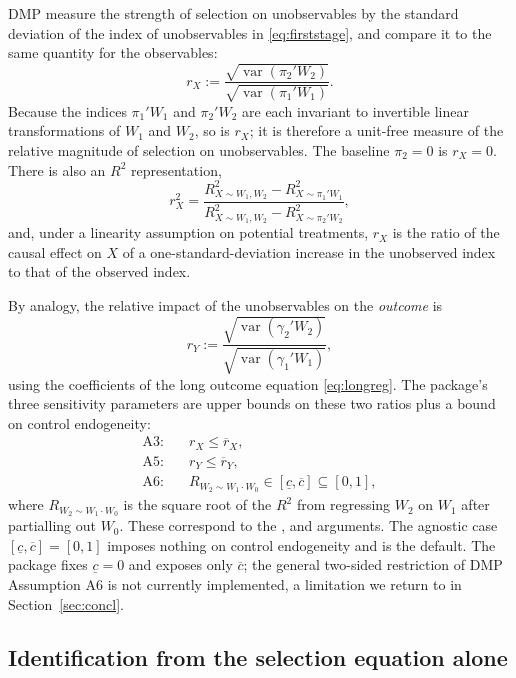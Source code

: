 \documentclass[article]{jss}\usepackage[]{graphicx}\usepackage[]{xcolor}
\newcommand{\rxbar}{\ensuremath{\overline{r}_X}}
\newcommand{\rybar}{\ensuremath{\overline{r}_Y}}
\newcommand{\cbar}{\ensuremath{\overline{c}}}
\newcommand{\clow}{\ensuremath{\underline{c}}}
\newcommand{\Rsq}[1]{\ensuremath{R^2_{#1}}}
\newcommand{\Var}{\operatorname{var}}
\begin{document}
DMP measure the strength of selection on unobservables by the standard
deviation of the index of unobservables in \eqref{eq:firststage}, and
compare it to the same quantity for the observables:
\begin{equation}
r_X := \frac{\sqrt{\Var(\pi_2' W_2)}}{\sqrt{\Var(\pi_1' W_1)}}.
\label{eq:rx}
\end{equation}
Because the indices $\pi_1' W_1$ and $\pi_2' W_2$ are each invariant to
invertible linear transformations of $W_1$ and $W_2$, so is $r_X$; it is
therefore a unit-free measure of the relative magnitude of selection on
unobservables. The baseline $\pi_2 = 0$ is $r_X = 0$. There is also an
$R^2$ representation,
\begin{equation}
r_X^2 = \frac{\Rsq{X \sim W_1, W_2} - \Rsq{X \sim \pi_1' W_1}}
             {\Rsq{X \sim W_1, W_2} - \Rsq{X \sim \pi_2' W_2}},
\label{eq:rxr2}
\end{equation}
and, under a linearity assumption on potential treatments, $r_X$ is the
ratio of the causal effect on $X$ of a one-standard-deviation increase in
the unobserved index to that of the observed index.

By analogy, the relative impact of the unobservables on the \emph{outcome}
is
\begin{equation}
r_Y := \frac{\sqrt{\Var(\gamma_2' W_2)}}{\sqrt{\Var(\gamma_1' W_1)}},
\label{eq:ry}
\end{equation}
using the coefficients of the long outcome equation \eqref{eq:longreg}.
The package's three sensitivity parameters are upper bounds on these two
ratios plus a bound on control endogeneity:
\begin{align}
\text{A3:}\quad & r_X \le \rxbar, \\
\text{A5:}\quad & r_Y \le \rybar, \\
\text{A6:}\quad & R_{W_2 \sim W_1 \cdot W_0} \in [\clow, \cbar]
                  \subseteq [0, 1],
\end{align}
where $R_{W_2 \sim W_1 \cdot W_0}$ is the square root of the $R^2$ from
regressing $W_2$ on $W_1$ after partialling out $W_0$. These correspond to
the ,  and  arguments. The agnostic case
$[\clow, \cbar] = [0, 1]$ imposes nothing on control endogeneity and is the
default. The package fixes $\clow = 0$ and exposes only $\cbar$; the
general two-sided restriction of DMP Assumption A6 is not currently
implemented, a limitation we return to in Section~\ref{sec:concl}.

\subsection{Identification from the selection equation alone}
\label{sec:thm1}
\end{document}
